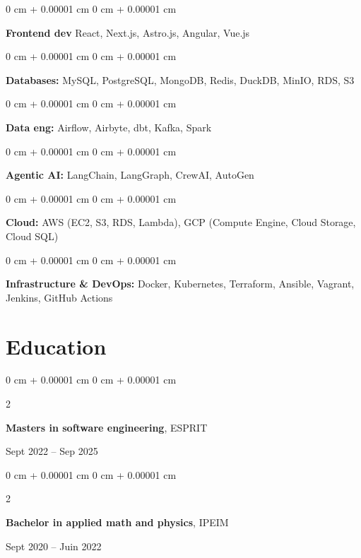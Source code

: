 \documentclass[10pt, letterpaper]{article}
\newenvironment{onecolentry}{
  \begin{adjustwidth}{
      0 cm + 0.00001 cm
    }{
      0 cm + 0.00001 cm
    }
  }{
  \end{adjustwidth}
} %
\newenvironment{twocolentry}[2][]{
  \onecolentry
  \def\secondColumn{#2}
  \setcolumnwidth{\fill, 4.5 cm}
  \begin{paracol}{2}
  }{
    \switchcolumn \raggedleft \secondColumn
  \end{paracol}
  \endonecolentry
} %
\begin{document}
  \begin{onecolentry}
    \textbf{Frontend dev} React, Next.js, Astro.js, Angular, Vue.js
  \end{onecolentry}


  \vspace{0.2 cm}

  \begin{onecolentry}
    \textbf{Databases:} MySQL, PostgreSQL, MongoDB, Redis, DuckDB, MinIO, RDS, S3
  \end{onecolentry}

  \vspace{0.2 cm}

  \begin{onecolentry}
    \textbf{Data eng: }  Airflow, Airbyte, dbt, Kafka, Spark
  \end{onecolentry}

  \vspace{0.2 cm}

  \begin{onecolentry}
    \textbf{Agentic AI:} LangChain, LangGraph, CrewAI, AutoGen
  \end{onecolentry}

  \vspace{0.2 cm}


  \begin{onecolentry}
    \textbf{Cloud:} AWS (EC2, S3, RDS, Lambda), GCP (Compute Engine, Cloud Storage, Cloud SQL)
  \end{onecolentry}

  \vspace{0.2 cm}


  \begin{onecolentry}
    \textbf{Infrastructure \& DevOps:} Docker, Kubernetes, Terraform, Ansible, Vagrant, Jenkins, GitHub Actions
  \end{onecolentry}






  \section{Education}




  \begin{twocolentry}{
      Sept 2022 – Sep 2025
    }
    \textbf{Masters in software engineering}, ESPRIT
  \end{twocolentry}

  \vspace{0.10 cm}

  \begin{twocolentry}{
      Sept 2020 – Juin 2022
    }
    \textbf{Bachelor in applied math and physics}, IPEIM
  \end{twocolentry}




  
\end{document}
